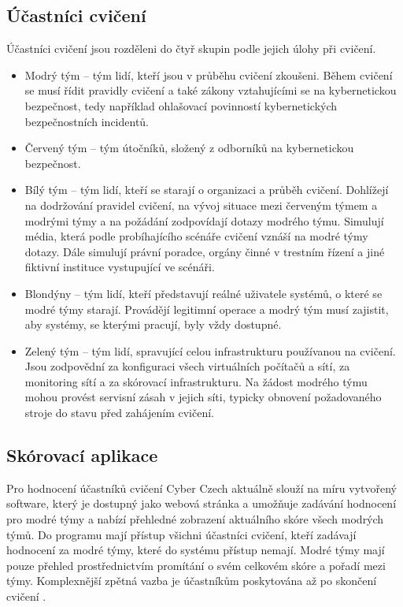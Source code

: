 \documentclass[
  digital, %
  twoside, %
  table,   %
  nolof,     %
  nolot,     %
]{fithesis3}
\begin{document}
\subsection{Účastníci cvičení}
Účastníci cvičení jsou rozděleni do čtyř skupin podle jejich úlohy při cvičení.

\begin{itemize}
\item Modrý tým -- tým lidí, kteří jsou v průběhu cvičení zkoušeni. Během cvičení se musí řídit pravidly cvičení a také zákony vztahujícími se na kybernetickou bezpečnost, tedy například ohlašovací povinností kybernetických bezpečnostních incidentů.
\item Červený tým -- tým útočníků, složený z odborníků na kybernetickou bezpečnost. 
\item Bílý tým -- tým lidí, kteří se starají o organizaci a průběh cvičení. Dohlížejí na dodržování pravidel cvičení, na vývoj situace mezi červeným týmem a modrými týmy a na požádání zodpovídají dotazy modrého týmu. Simulují média, která podle probíhajícího scénáře cvičení vznáší na modré týmy dotazy. Dále simulují právní poradce, orgány činné v trestním řízení a jiné fiktivní instituce vystupující ve scénáři.
\item Blondýny -- tým lidí, kteří představují reálné uživatele systémů, o které se modré týmy starají. Provádějí legitimní operace a modrý tým musí zajistit, aby systémy, se kterými pracují, byly vždy dostupné.
\item Zelený tým -- tým lidí, spravující celou infrastrukturu používanou na cvičení. Jsou zodpovědní za konfiguraci všech virtuálních počítačů a sítí, za monitoring sítí a za skórovací infrastrukturu. Na žádost modrého týmu mohou provést servisní zásah v jejich síti, typicky obnovení požadovaného stroje do stavu před zahájením cvičení.
\end{itemize}

\subsection{Skórovací aplikace}
Pro hodnocení účastníků cvičení Cyber Czech aktuálně slouží na míru vytvořený software, který je dostupný jako webová stránka a umožňuje zadávání hodnocení pro modré týmy a nabízí přehledné zobrazení aktuálního skóre všech modrých týmů. Do programu mají přístup všichni účastníci cvičení, kteří zadávají hodnocení za modré týmy, které do systému přístup nemají. Modré týmy mají pouze přehled prostřednictvím promítání o svém celkovém skóre a pořadí mezi týmy. Komplexnější zpětná vazba je účastníkům poskytována až po skončení cvičení \cite{Vykopal2017TimelyExercises}.
\end{document}
